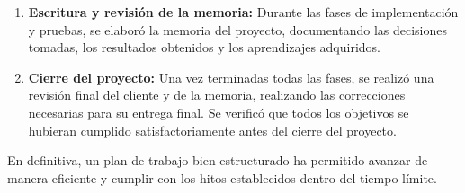 \begin{enumerate}
    \item \textbf{Escritura y revisión de la memoria:}
    Durante las fases de implementación y pruebas, se elaboró la memoria del proyecto, documentando las decisiones tomadas, los resultados obtenidos y los aprendizajes adquiridos.

    \item \textbf{Cierre del proyecto:}
    Una vez terminadas todas las fases, se realizó una revisión final del cliente y de la memoria, realizando las correcciones necesarias para su entrega final.
    Se verificó que todos los objetivos se hubieran cumplido satisfactoriamente antes del cierre del proyecto.
\end{enumerate}

En definitiva, un plan de trabajo bien estructurado ha permitido avanzar de manera eficiente y cumplir con los hitos establecidos dentro del tiempo límite.
